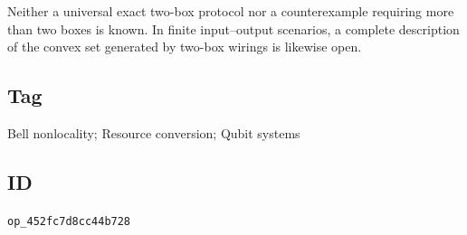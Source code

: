 Neither a universal exact two-box protocol nor a counterexample requiring
more than two boxes is known.  In finite input--output scenarios, a complete
description of the convex set generated by two-box wirings is likewise open.

\subsection*{Tag}

Bell nonlocality; Resource conversion; Qubit systems

\subsection*{ID}

\texttt{op\_452fc7d8cc44b728}
